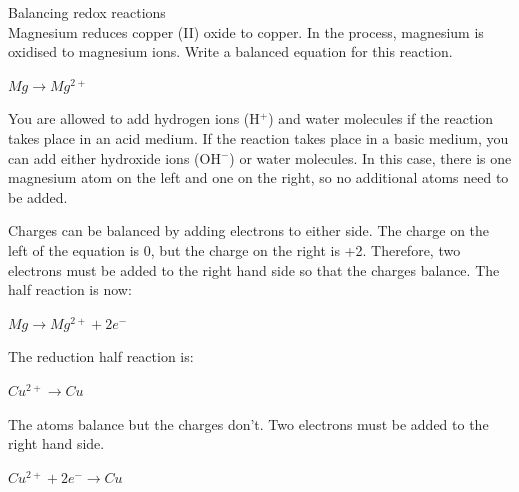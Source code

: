 \begin{wex}{Balancing redox reactions\\}{Magnesium reduces copper (II) oxide to copper. In the process, magnesium is oxidised to magnesium ions. Write a balanced equation for this reaction.\\}

{

\begin{center}
\rm${Mg \rightarrow Mg^{2+}}$\\
\end{center}

You are allowed to add hydrogen ions (H$^{+}$) and water molecules if the reaction takes place in an acid medium. If the reaction takes place in a basic medium, you can add either hydroxide ions (OH$^{-}$) or water molecules. In this case, there is one magnesium atom on the left and one on the right, so no additional atoms need to be added.\\

Charges can be balanced by adding electrons to either side. The charge on the left of the equation is 0, but the charge on the right is +2. Therefore, two electrons must be added to the right hand side so that the charges balance. The half reaction is now:

\begin{center}
\rm${Mg \rightarrow Mg^{2+} + 2e^{-}}$\\
\end{center}

The reduction half reaction is:

\begin{center}
\rm${Cu^{2+} \rightarrow Cu}$
\end{center}

The atoms balance but the charges don't. Two electrons must be added to the right hand side.

\begin{center}
\rm${Cu^{2+} + 2e^{-} \rightarrow Cu}$\\
\end{center}

}
\end{wex}

